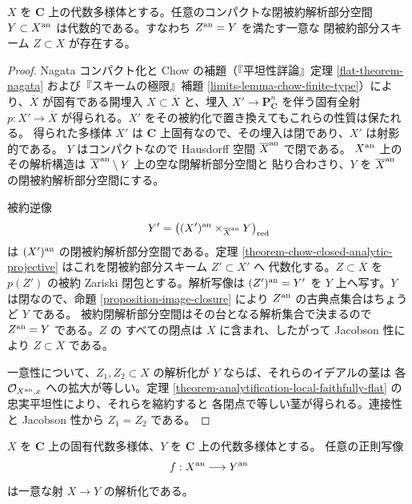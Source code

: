\begin{proposition}
\label{proposition-compact-analytic-subspace-algebraic}
\begin{reference}
\cite[\S 4、第19項、命題14]{GAGA}
\end{reference}
$X$ を $\mathbf C$ 上の代数多様体とする。任意のコンパクトな閉被約解析部分空間
$Y\subset X^{\rm an}$ は代数的である。すなわち $Z^{\rm an}=Y$ を満たす一意な
閉被約部分スキーム $Z\subset X$ が存在する。
\end{proposition}

\begin{proof}
Nagata コンパクト化と Chow の補題（『平坦性詳論』定理
\ref{flat-theorem-nagata} および『スキームの極限』補題
\ref{limits-lemma-chow-finite-type}）により、$\overline X$ が固有である開埋入
$X\subset\overline X$ と、埋入 $X'\to\mathbf P^n_{\mathbf C}$ を伴う固有全射
$p:X'\to\overline X$ が得られる。$X'$ をその被約化で置き換えてもこれらの性質は保たれる。
得られた多様体 $X'$ は $\mathbf C$ 上固有なので、その埋入は閉であり、$X'$ は射影的である。
$Y$ はコンパクトなので Hausdorff 空間 $\overline X^{\rm an}$ で閉である。
$X^{\rm an}$ 上のその解析構造は $\overline X^{\rm an}\setminus Y$ 上の空な閉解析部分空間と
貼り合わさり、$Y$ を $\overline X^{\rm an}$ の閉被約解析部分空間にする。

被約逆像
$$
Y'=\left((X')^{\rm an}\times_{\overline X^{\rm an}}Y\right)_{\rm red}
$$
は $(X')^{\rm an}$ の閉被約解析部分空間である。定理
\ref{theorem-chow-closed-analytic-projective} はこれを閉被約部分スキーム $Z'\subset X'$ へ
代数化する。$Z\subset\overline X$ を $p(Z')$ の被約 Zariski 閉包とする。解析写像は
$(Z')^{\rm an}=Y'$ を $Y$ 上へ写す。$Y$ は閉なので、命題
\ref{proposition-image-closure} により $Z^{\rm an}$ の古典点集合はちょうど $Y$ である。
被約閉解析部分空間はその台となる解析集合で決まるので $Z^{\rm an}=Y$ である。$Z$ の
すべての閉点は $X$ に含まれ、したがって Jacobson 性により $Z\subset X$ である。

一意性について、$Z_1,Z_2\subset X$ の解析化が $Y$ ならば、それらのイデアルの茎は
各 $\mathcal O_{X^{\rm an},x}$ への拡大が等しい。定理
\ref{theorem-analytification-local-faithfully-flat} の忠実平坦性により、それらを縮約すると
各閉点で等しい茎が得られる。連接性と Jacobson 性から $Z_1=Z_2$ である。
\end{proof}

\begin{proposition}
\label{proposition-holomorphic-map-from-proper-is-regular}
\begin{reference}
\cite[\S 4、第19項、命題15]{GAGA}
\end{reference}
$X$ を $\mathbf C$ 上の固有代数多様体、$Y$ を $\mathbf C$ 上の代数多様体とする。
任意の正則写像
$$
f:X^{\rm an}\longrightarrow Y^{\rm an}
$$
は一意な射 $X\to Y$ の解析化である。
\end{proposition}

